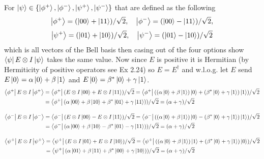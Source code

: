 \documentclass[12pt]{exam}
\begin{document}
\begin{solution}
    For $\ket{\psi}\in \{\ket{\phi^+}, \ket{\phi^-},\ket{\psi^+}, \ket{\psi^-}\}$ that are defined as the following
    $$\ket{\phi^+} = (\ket{00}+\ket{11})/\sqrt{2}, \quad
    \ket{\phi^-} = (\ket{00}-\ket{11})/\sqrt{2}, $$ $$
    \ket{\psi^+} = (\ket{01}+\ket{10})/\sqrt{2}, \quad 
    \ket{\psi^-} = (\ket{01}-\ket{10})/\sqrt{2}$$
     which is all vectors of the Bell basis then casing out of the four options show $\bra{\psi}E\otimes I\ket{\psi}$ takes the same value. Now since $E$ is positive it is Hermitian (by Hermiticity of positive operators see Ex 2.24) so $E=E^\dagger$ and w.l.o.g. let $E$ send $E\ket{0}=\alpha\ket{0} +\beta\ket{1}$ and $E\ket{0}=\beta^*\ket{0} +\gamma\ket{1}$. 
    \begin{equation*}
            \begin{split}
                \bra{\phi^+}E\otimes I\ket{\phi^+}
        &=\bra{\phi^+}(E\otimes I\ket{00}+E\otimes  I\ket{11})/\sqrt{2} 
        = \bra{\phi^+}((\alpha\ket{0} +\beta\ket{1})\ket{0}+ (\beta^*\ket{0} +\gamma\ket{1})  \ket{1})/\sqrt{2} \\
        &= \bra{\phi^+}(\alpha\ket{00} +\beta\ket{10} + \beta^*\ket{01} +\gamma\ket{11})  )/\sqrt{2} = (\alpha+\gamma)/\sqrt{2}
            \end{split}
        \end{equation*}

    \begin{equation*}
            \begin{split}
                \bra{\phi^-}E\otimes I\ket{\phi^-}
        &=\bra{\phi^-}(E\otimes I\ket{00}-E\otimes  I\ket{11})/\sqrt{2} 
        = \bra{\phi^-}((\alpha\ket{0} +\beta\ket{1})\ket{0}- (\beta^*\ket{0} +\gamma\ket{1})  \ket{1})/\sqrt{2} \\
        &= \bra{\phi^-}(\alpha\ket{00} +\beta\ket{10} - \beta^*\ket{01} -\gamma\ket{11})  )/\sqrt{2} = (\alpha+\gamma)/\sqrt{2}
            \end{split}
        \end{equation*}

    \begin{equation*}
            \begin{split}
                \bra{\psi^+}E\otimes I\ket{\psi^+}
        &=\bra{\psi^+}(E\otimes I\ket{01}+E\otimes  I\ket{10})/\sqrt{2} 
        = \bra{\psi^+}((\alpha\ket{0} +\beta\ket{1})\ket{1}+ (\beta^*\ket{0} +\gamma\ket{1})  \ket{0})/\sqrt{2} \\
        &= \bra{\psi^+}(\alpha\ket{01} +\beta\ket{11} + \beta^*\ket{00} +\gamma\ket{10})  )/\sqrt{2} = (\alpha+\gamma)/\sqrt{2}
            \end{split}
        \end{equation*}


\end{solution}
\end{document}
